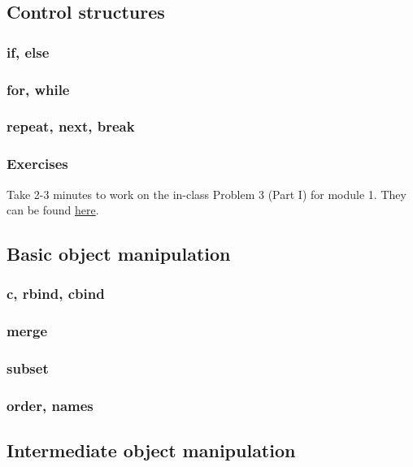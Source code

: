 \documentclass{beamer}
\begin{document}
\subsection{Control structures}

\begin{frame}[fragile]
    \frametitle{if, else}
    
\end{frame}


\begin{frame}[fragile]
    \frametitle{for, while}
    
\end{frame}


\begin{frame}[fragile]
    \frametitle{repeat, next, break}
    
\end{frame}


\begin{frame}
    \frametitle{Exercises}
    Take 2-3 minutes to work on the in-class Problem 3 (Part I) for module 1.
    They can be found \href{https://github.com/rnitulescu/RcourseOncology2021/blob/master/exercises1.R}{here}.
\end{frame}


\subsection{Basic object manipulation}

\begin{frame}[fragile]
    \frametitle{c, rbind, cbind}
    
\end{frame}


\begin{frame}[fragile]
    \frametitle{merge}
    
\end{frame}


\begin{frame}[fragile]
    \frametitle{subset}
    
\end{frame}


\begin{frame}[fragile]
    \frametitle{order, names}
    
\end{frame}


\subsection{Intermediate object manipulation}
\end{document}
